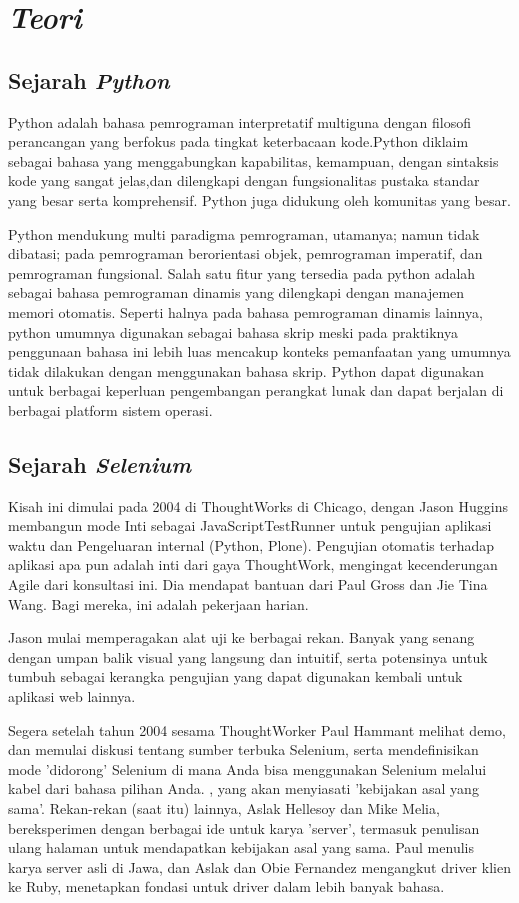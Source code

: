 \chapter{\textit{Teori}}
\section{Sejarah \textit{Python}}
\par Python adalah bahasa pemrograman interpretatif multiguna dengan filosofi perancangan yang berfokus pada tingkat keterbacaan kode.Python diklaim sebagai bahasa yang menggabungkan kapabilitas, kemampuan, dengan sintaksis kode yang sangat jelas,dan dilengkapi dengan fungsionalitas pustaka standar yang besar serta komprehensif. Python juga didukung oleh komunitas yang besar.

\par Python mendukung multi paradigma pemrograman, utamanya; namun tidak dibatasi; pada pemrograman berorientasi objek, pemrograman imperatif, dan pemrograman fungsional. Salah satu fitur yang tersedia pada python adalah sebagai bahasa pemrograman dinamis yang dilengkapi dengan manajemen memori otomatis. Seperti halnya pada bahasa pemrograman dinamis lainnya, python umumnya digunakan sebagai bahasa skrip meski pada praktiknya penggunaan bahasa ini lebih luas mencakup konteks pemanfaatan yang umumnya tidak dilakukan dengan menggunakan bahasa skrip. Python dapat digunakan untuk berbagai keperluan pengembangan perangkat lunak dan dapat berjalan di berbagai platform sistem operasi.
\section{Sejarah \textit{Selenium}}
Kisah ini dimulai pada 2004 di ThoughtWorks di Chicago, dengan Jason Huggins membangun mode Inti sebagai JavaScriptTestRunner untuk pengujian aplikasi waktu dan Pengeluaran internal (Python, Plone). Pengujian otomatis terhadap aplikasi apa pun adalah inti dari gaya ThoughtWork, mengingat kecenderungan Agile dari konsultasi ini. Dia mendapat bantuan dari Paul Gross dan Jie Tina Wang. Bagi mereka, ini adalah pekerjaan harian.

Jason mulai memperagakan alat uji ke berbagai rekan. Banyak yang senang dengan umpan balik visual yang langsung dan intuitif, serta potensinya untuk tumbuh sebagai kerangka pengujian yang dapat digunakan kembali untuk aplikasi web lainnya.

Segera setelah tahun 2004 sesama ThoughtWorker Paul Hammant melihat demo, dan memulai diskusi tentang sumber terbuka Selenium, serta mendefinisikan mode 'didorong' Selenium di mana Anda bisa menggunakan Selenium melalui kabel dari bahasa pilihan Anda. , yang akan menyiasati 'kebijakan asal yang sama'. Rekan-rekan (saat itu) lainnya, Aslak Hellesoy dan Mike Melia, bereksperimen dengan berbagai ide untuk karya 'server', termasuk penulisan ulang halaman untuk mendapatkan kebijakan asal yang sama. Paul menulis karya server asli di Jawa, dan Aslak dan Obie Fernandez mengangkut driver klien ke Ruby, menetapkan fondasi untuk driver dalam lebih banyak bahasa.

